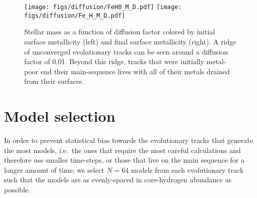 \documentclass[manuscript]{aastex}
\begin{document}
\begin{figure*}
    \centering
    \texttt{[image: figs/diffusion/FeH0\_M\_D.pdf]}\hfill
    \texttt{[image: figs/diffusion/Fe\_H\_M\_D.pdf]}
    \caption{Stellar mass as a function of diffusion factor colored by initial surface metallicity (left) and final surface metallicity (right). A ridge of unconverged evolutionary tracks can be seen around a diffusion factor of 0.01. Beyond this ridge, tracks that were initially metal-poor end their main-sequence lives with all of their metals drained from their surfaces. } 
    \label{fig:diffusion-gap}
\end{figure*}


\section{Model selection}
\label{sec:selection}
In order to prevent statistical bias towards the evolutionary tracks that generate the most models, i.e.~the ones that require the most careful calculations and therefore use smaller time-steps, or those that live on the main sequence for a longer amount of time; we select $N=64$ models from each evolutionary track such that the models are as evenly-spaced in core-hydrogen abundance as possible. 
\end{document}
